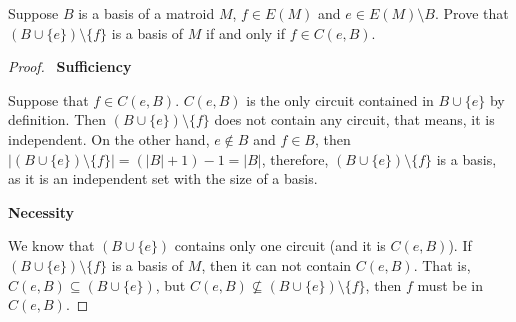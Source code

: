 \prob
{
    Suppose $B$ is a basis of a matroid $M$, $f \in E(M)$ and $e \in E(M) \setminus B$.
    Prove that $(B\cup \{e\}) \setminus \{ f \}$ is a basis of $M$ if and only if $f \in C(e, B)$.
}

\begin{proof}$\,$\pn
    \textbf{Sufficiency}\pn
    
    Suppose that $f \in C(e, B)$. $C(e, B)$ is the only circuit contained in $B \cup \{e\}$ by definition. Then
    $(B \cup \{e\}) \setminus \{f\}$ does not contain any circuit, that means, it is independent. On the other hand,
    $e \notin B$ and $f \in B$, then $|(B \cup \{e\}) \setminus \{f\}| = (|B| + 1) - 1 = |B|$, therefore,
    $(B \cup \{e\}) \setminus \{f\}$ is a basis, as it is an independent set with the size of a basis.\pn
    
    
    \textbf{Necessity}\pn
    
    We know that $(B \cup \{e\})$ contains only one circuit (and it is $C(e, B)$). If $(B\cup \{e\}) \setminus \{ f \}$ is
    a basis of $M$, then it can not contain $C(e, B)$. That is, $C(e, B) \subseteq (B \cup \{e\})$, but 
    $C(e, B) \not\subseteq (B \cup \{e\}) \setminus \{f\}$, then $f$ must be in $C(e, B)$.\pn 
    
\end{proof}